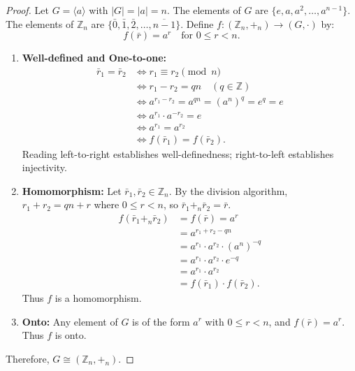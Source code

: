 \documentclass[12pt]{article}
\theoremstyle{definition}
\theoremstyle{plain}
\begin{document}
\begin{proof}
Let $G = \langle a \rangle$ with $|G| = |a| = n$.
The elements of $G$ are $\{e, a, a^2, \dots, a^{n-1}\}$.
The elements of $\mathbb{Z}_n$ are $\{\bar{0}, \bar{1}, \bar{2}, \dots, \overline{n-1}\}$.
Define $f: (\mathbb{Z}_n, +_n) \longrightarrow (G, \cdot)$ by:
\[
f(\bar{r}) = a^r \quad \text{for } 0 \le r < n.
\]
\begin{enumerate}
    \item \textbf{Well-defined and One-to-one:}
    \begin{align*}
        \bar{r}_1 = \bar{r}_2 &\iff r_1 \equiv r_2 \pmod n \\
        &\iff r_1 - r_2 = qn \quad (q \in \mathbb{Z}) \\
        &\iff a^{r_1 - r_2} = a^{qn} = (a^n)^q = e^q = e \\
        &\iff a^{r_1} \cdot a^{-r_2} = e \\
        &\iff a^{r_1} = a^{r_2} \\
        &\iff f(\bar{r}_1) = f(\bar{r}_2).
    \end{align*}
    Reading left-to-right establishes well-definedness; right-to-left establishes injectivity.

    \item \textbf{Homomorphism:}
    Let $\bar{r}_1, \bar{r}_2 \in \mathbb{Z}_n$.
    By the division algorithm, $r_1 + r_2 = qn + r$ where $0 \le r < n$, so $\bar{r}_1 +_n \bar{r}_2 = \bar{r}$.
    \begin{align*}
        f(\bar{r}_1 +_n \bar{r}_2) &= f(\bar{r}) = a^r \\
        &= a^{r_1 + r_2 - qn} \\
        &= a^{r_1} \cdot a^{r_2} \cdot (a^n)^{-q} \\
        &= a^{r_1} \cdot a^{r_2} \cdot e^{-q} \\
        &= a^{r_1} \cdot a^{r_2} \\
        &= f(\bar{r}_1) \cdot f(\bar{r}_2).
    \end{align*}
    Thus $f$ is a homomorphism.

    \item \textbf{Onto:}
    Any element of $G$ is of the form $a^r$ with $0 \le r < n$, and $f(\bar{r}) = a^r$.
    Thus $f$ is onto.
\end{enumerate}
Therefore, $\boxed{G \cong (\mathbb{Z}_n, +_n)}$.
\end{proof}

\end{document}
